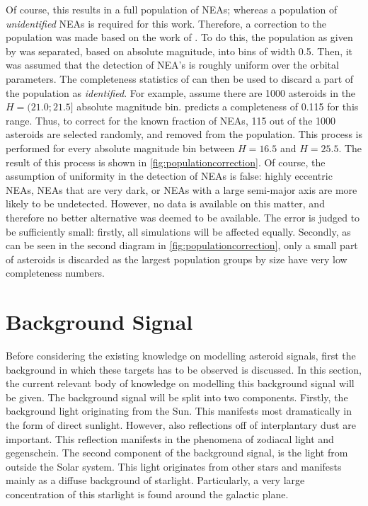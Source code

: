 Of course, this results in a full population of NEAs; whereas a population of \textit{unidentified} NEAs is required for this work. Therefore, a correction to the population was made based on the work of \cite{HarrisPopulation}. To do this, the population as given by \cite{GranvikPopulation} was separated, based on absolute magnitude, into bins of width 0.5. Then, it was assumed that the detection of NEA's is roughly uniform over the orbital parameters. The completeness statistics of \cite{HarrisPopulation} can then be used to discard a part of the population as \textit{identified}. For example, assume there are 1000 asteroids in the $H=(21.0; 21.5]$ absolute magnitude bin. \cite{HarrisPopulation} predicts a completeness of 0.115 for this range. Thus, to correct for the known fraction of NEAs, 115 out of the 1000 asteroids are selected randomly, and removed from the population. This process is performed for every absolute magnitude bin between $H=16.5$ and $H=25.5$. The result of this process is shown in \autoref{fig:populationcorrection}. Of course, the assumption of uniformity in the detection of NEAs is false: highly eccentric NEAs, NEAs that are very dark, or NEAs with a large semi-major axis are more likely to be undetected. However, no data is available on this matter, and therefore no better alternative was deemed to be available. The error is judged to be sufficiently small: firstly, all simulations will be affected equally. Secondly, as can be seen in the second diagram in \autoref{fig:populationcorrection}, only a small part of asteroids is discarded as the largest population groups by size have very low completeness numbers.

\section{Background Signal}
\label{sec:modelling_background}
Before considering the existing knowledge on modelling asteroid signals, first the background in which these targets has to be observed is discussed. In this section, the current relevant body of knowledge on modelling this background signal will be given. The background signal will be split into two components. Firstly, the background light originating from the Sun. This manifests most dramatically in the form of direct sunlight. However, also reflections off of interplantary dust are important. This reflection manifests in the phenomena of zodiacal light and gegenschein. The second component of the background signal, is the light from outside the Solar system. This light originates from other stars and manifests mainly as a diffuse background of starlight. Particularly, a very large concentration of this starlight is found around the galactic plane. \\

